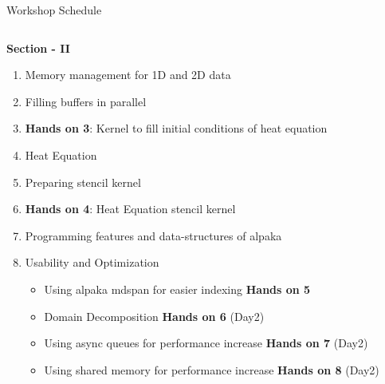 \documentclass[9pt]{beamer}
\begin{document}
\begin{frame}[t]{Workshop Schedule}
\begin{columns}[T]
\begin{column}{0.56\textwidth}
\textbf{\small Section - II}
\begin{enumerate}
    \item \small Memory management for 1D and 2D data
    \item \small Filling buffers in parallel
    \item \small \textbf{Hands on 3}: Kernel to fill initial conditions of heat equation
    \item \small Heat Equation
    \item \small Preparing stencil kernel
    \item \small \textbf{Hands on 4}: Heat Equation stencil kernel
    \item \small Programming features and data-structures of alpaka
    \item \small Usability and Optimization
    \begin{itemize}
        \item \scriptsize Using alpaka mdspan for easier indexing
              \textbf{Hands on 5}
        \item \scriptsize Domain Decomposition
              \textbf{Hands on 6} (Day2)
        \item \scriptsize Using async queues for performance increase
              \textbf{Hands on 7} (Day2)
        \item \scriptsize Using shared memory for performance increase
              \textbf{Hands on 8} (Day2)
    \end{itemize}
\end{enumerate}
\end{column}

\end{columns}
\end{frame}


\end{document}
